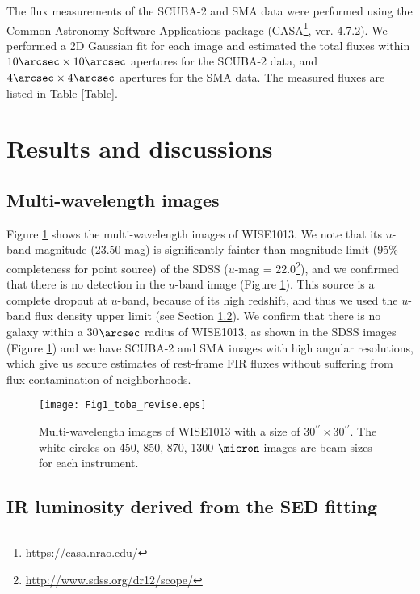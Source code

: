 \documentclass[twocolumn]{aastex6}
\begin{document}
The flux measurements of the SCUBA-2 and SMA data were performed using the Common Astronomy Software Applications package (CASA\footnote{\url{https://casa.nrao.edu/}}, ver. 4.7.2).
We performed a 2D Gaussian fit for each image and estimated the total fluxes within $10\arcsec \times 10\arcsec$ apertures for the SCUBA-2 data, and $4\arcsec \times 4\arcsec$ apertures for the SMA data.
The measured fluxes are listed in Table \ref{Table}.



\section{Results and discussions}
\subsection{Multi-wavelength images}
Figure \ref{image} shows the multi-wavelength images of WISE1013.
We note that its $u$-band magnitude (23.50 mag) is significantly fainter than magnitude limit (95\% completeness for point source) of the SDSS ($u$-mag = 22.0\footnote{\url{http://www.sdss.org/dr12/scope/}}), and we confirmed that there is no detection in the $u$-band image (Figure \ref{image}).
This source is a complete dropout at $u$-band, because of its high redshift, and thus we used the $u$-band flux density upper limit (see Section \ref{SED_fit}).
We confirm that there is no galaxy within a 30$\arcsec$ radius of WISE1013, as shown in the SDSS images (Figure \ref{image}) and we have SCUBA-2 and SMA images with high angular resolutions, which give us secure estimates of rest-frame FIR fluxes without suffering from flux contamination of neighborhoods.

     \begin{figure*}
   \centering
   \texttt{[image: Fig1\_toba\_revise.eps]}
   \caption{Multi-wavelength images of WISE1013 with a size of $30^{\prime\prime} \times 30^{\prime\prime}$. The white circles on 450, 850, 870, 1300 $\micron$ images are beam sizes for each instrument.}
   \label{image}
   \end{figure*} 

\subsection{IR luminosity derived from the SED fitting}
\label{SED_fit}
\end{document}
